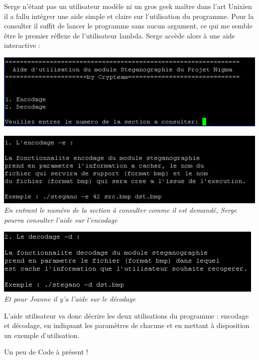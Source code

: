 \documentclass[a4paper,12pt]{article}
\begin{document}
Serge n'étant pas un utilisateur modèle ni un gros geek maître dans l'art Unixien il a fallu intégrer une aide simple et claire sur l'utilisation du programme. Pour la consulter il suffit de lancer le programme sans aucun argument, ce qui me semble être le premier réflexe de l'utilisateur lambda. Serge accède alors à une aide interactive :

\begin{center}	
  \includegraphics[scale=0.75]{aide1.JPG}
\end{center}

\begin{center}	
  \includegraphics[scale=0.75]{aide3.JPG}
  \textit{\\En entrant le numéro de la section à consulter comme il est demandé, Serge pourra consulter l'aide sur l'encodage}
\end{center}

\begin{center}	
  \includegraphics[scale=0.75]{aide2.JPG}
  \textit{\\Et pour Jeanne il y'a l'aide sur le décodage}
\end{center}

L'aide utilisateur va donc décrire les deux utilisations du programme : encodage et décodage, en indiquant les paramètres de chacune et en mettant à disposition un exemple d'utilisation.

Un peu de Code à présent !
\end{document}
